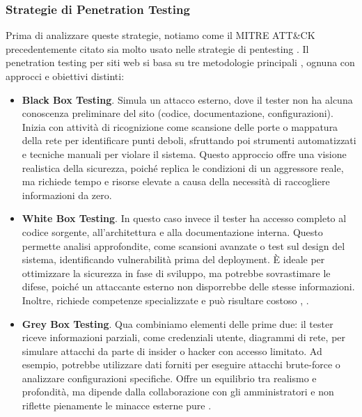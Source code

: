          \subsubsection{Strategie di Penetration Testing}
            Prima di analizzare queste strategie, notiamo come il MITRE ATT\&CK precedentemente citato sia molto usato nelle strategie di pentesting \cite{mitre_attt_ck_in_pentest}.
            Il penetration testing per siti web si basa su tre metodologie principali \cite{pen_testing}, ognuna con approcci e obiettivi distinti:
            \begin{itemize}
                \item \textbf{Black Box Testing}. Simula un attacco esterno, dove il tester non ha alcuna conoscenza preliminare del sito (codice, documentazione, configurazioni). Inizia con attività di ricognizione come scansione delle porte o mappatura della rete per identificare punti deboli, sfruttando poi strumenti automatizzati e tecniche manuali per violare il sistema. Questo approccio offre una visione realistica della sicurezza, poiché replica le condizioni di un aggressore reale, ma richiede tempo e risorse elevate a causa della necessità di raccogliere informazioni da zero\cite{black_box}.
                \item \textbf{White Box Testing}. In questo caso invece il tester ha accesso completo al codice sorgente, all'architettura e alla documentazione interna. Questo permette analisi approfondite, come scansioni avanzate o test sul design del sistema, identificando vulnerabilità prima del deployment. È ideale per ottimizzare la sicurezza in fase di sviluppo, ma potrebbe sovrastimare le difese, poiché un attaccante esterno non disporrebbe delle stesse informazioni. Inoltre, richiede competenze specializzate e può risultare costoso \cite{white_box}, \cite{white_box_2}.

\newpage
                
                \item \textbf{Grey Box Testing}. Qua combiniamo elementi delle prime due: il tester riceve informazioni parziali, come credenziali utente, diagrammi di rete, per simulare attacchi da parte di insider o hacker con accesso limitato. Ad esempio, potrebbe utilizzare dati forniti per eseguire attacchi brute-force o analizzare configurazioni specifiche. Offre un equilibrio tra realismo e profondità, ma dipende dalla collaborazione con gli amministratori e non riflette pienamente le minacce esterne pure \cite{grey_box}.
            \end{itemize}

